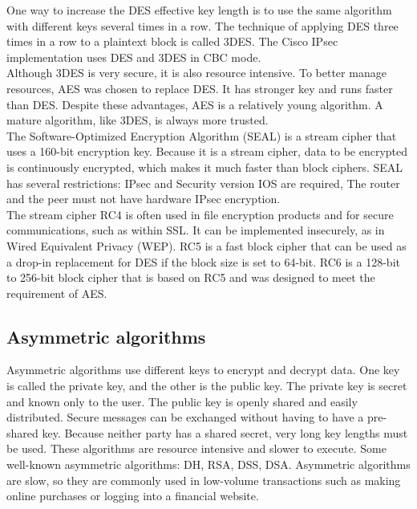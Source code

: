 
One way to increase the DES effective key length is to use the same algorithm with different keys several times in a row. The technique of applying DES three times in a row to a plaintext block is called 3DES. The Cisco IPsec implementation uses DES and 3DES in CBC mode.\\

Although 3DES is very secure, it is also resource intensive. To better manage resources, AES was chosen to replace DES. It has stronger key and runs faster than DES. Despite these advantages, AES is a relatively young algorithm. A mature algorithm, like 3DES, is always more trusted.\\

The Software-Optimized Encryption Algorithm (SEAL) is a stream cipher that uses a 160-bit encryption key. Because it is a stream cipher, data to be encrypted is continuously encrypted, which makes it much faster than block ciphers. SEAL has several restrictions: IPsec and Security version IOS are required, The router and the peer must not have hardware IPsec encryption.\\

The stream cipher RC4 is often used in file encryption products and for secure communications, such as within SSL. It can be implemented insecurely, as in Wired Equivalent Privacy (WEP). RC5 is a fast block cipher that can be used as a drop-in replacement for DES if the block size is set to 64-bit. RC6 is a 128-bit to 256-bit block cipher that is based on RC5 and was designed to meet the requirement of AES.\\

\subsection{Asymmetric algorithms}

Asymmetric algorithms use different keys to encrypt and decrypt data. One key is called the private key, and the other is the public key. The private key is secret and known only to the user. The public key is openly shared and easily distributed. Secure messages can be exchanged without having to have a pre-shared key. Because neither party has a shared secret, very long key lengths must be used. These algorithms are resource intensive and slower to execute. Some well-known asymmetric algorithms: DH, RSA, DSS,	DSA. Asymmetric algorithms are slow, so they are commonly used in low-volume transactions such as making online purchases or logging into a financial website.\\

